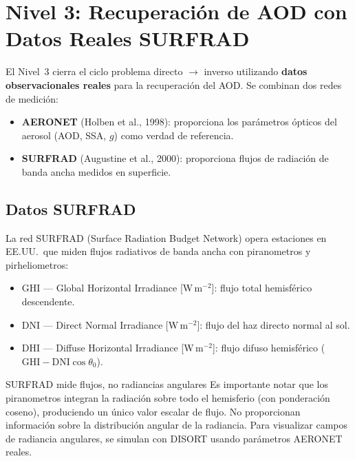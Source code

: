 \documentclass[a4paper,11pt]{article}
\begin{document}
\section{Nivel 3: Recuperaci\'on de AOD con Datos Reales SURFRAD}
\label{sec:surfrad}

El Nivel~3 cierra el ciclo problema directo $\to$ inverso utilizando
\textbf{datos observacionales reales} para la recuperaci\'on del AOD.  Se
combinan dos redes de medici\'on:
\begin{itemize}
    \item \textbf{AERONET} (Holben et al., 1998): proporciona los par\'ametros
          \'opticos del aerosol (AOD, SSA, $g$) como verdad de referencia.
    \item \textbf{SURFRAD} (Augustine et al., 2000): proporciona flujos de
          radiaci\'on de banda ancha medidos en superficie.
\end{itemize}

\subsection{Datos SURFRAD}

La red SURFRAD (Surface Radiation Budget Network) opera estaciones en EE.UU.\
que miden flujos radiativos de banda ancha con piranometros y pirheliometros:
\begin{itemize}
    \item $\text{GHI}$ --- Global Horizontal Irradiance [W\,m$^{-2}$]:
          flujo total hemisf\'erico descendente.
    \item $\text{DNI}$ --- Direct Normal Irradiance [W\,m$^{-2}$]:
          flujo del haz directo normal al sol.
    \item $\text{DHI}$ --- Diffuse Horizontal Irradiance [W\,m$^{-2}$]:
          flujo difuso hemisf\'erico ($\text{GHI} - \text{DNI}\cos\theta_0$).
\end{itemize}

\begin{physics}{SURFRAD mide flujos, no radiancias angulares}
Es importante notar que los piranometros integran la radiaci\'on sobre todo el
hemisferio (con ponderaci\'on coseno), produciendo un \'unico valor escalar de
flujo.  No proporcionan informaci\'on sobre la distribuci\'on angular de la
radiancia.  Para visualizar campos de radiancia angulares, se simulan con DISORT
usando par\'ametros AERONET reales.
\end{physics}
\end{document}
